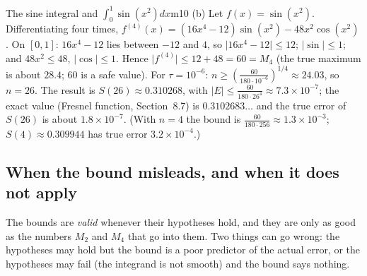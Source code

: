 \documentclass[11pt]{article}
\begin{document}
\begin{exmp}{The sine integral and $\int_0^1\sin\left(x^2\right)dx$}{m10}
(b) Let $f(x)=\sin\left(x^2\right)$. Differentiating four times, $f^{(4)}(x)=\left(16x^4-12\right)\sin\left(x^2\right)-48x^2\cos\left(x^2\right)$. On $[0,1]$: $16x^4-12$ lies between $-12$ and $4$, so $\lvert16x^4-12\rvert\le12$; $\lvert\sin\rvert\le1$; and $48x^2\le48$, $\lvert\cos\rvert\le1$. Hence $\lvert f^{(4)}\rvert\le12+48=60=M_4$ (the true maximum is about $28.4$; $60$ is a safe value). For $\tau=10^{-6}$: $n\ge\left(\frac{60}{180\cdot10^{-6}}\right)^{1/4}\approx24.03$, so $n=26$. The result is $S(26)\approx0.310268$, with $\lvert E\rvert\le\frac{60}{180\cdot26^4}\approx7.3\times10^{-7}$; the exact value (Fresnel function, Section~8.7) is $0.3102683\ldots$ and the true error of $S(26)$ is about $1.8\times10^{-7}$. (With $n=4$ the bound is $\frac{60}{180\cdot256}\approx1.3\times10^{-3}$; $S(4)\approx0.309944$ has true error $3.2\times10^{-4}$.)
\end{exmp}

\subsection*{When the bound misleads, and when it does not apply}

The bounds are \emph{valid} whenever their hypotheses hold, and they are only as good as the numbers $M_2$ and $M_4$ that go into them. Two things can go wrong: the hypotheses may hold but the bound is a poor predictor of the actual error, or the hypotheses may fail (the integrand is not smooth) and the bound says nothing.
\end{document}
